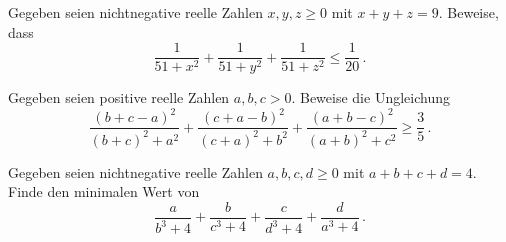 \begin{aufgabe*}\label{aufgabe:51}
	Gegeben seien nichtnegative reelle Zahlen $x,y,z\geqslant 0$ mit $x+y+z=9$. Beweise, dass
	\begin{equation*}
		\frac{1}{51+x^2}+\frac{1}{51+y^2}+\frac{1}{51+z^2}\leqslant \frac1{20}\,.
	\end{equation*}
\end{aufgabe*}
\begin{aufgabe*}\label{aufgabe:b+c-aUngleichung}
	Gegeben seien positive reelle Zahlen $a,b,c>0$. Beweise die Ungleichung
	\begin{equation*}
		\frac{(b+c-a)^2}{(b+c)^2+a^2}+\frac{(c+a-b)^2}{(c+a)^2+b^2}+\frac{(a+b-c)^2}{(a+b)^2+c^2}\geqslant \frac35\,.
	\end{equation*}
\end{aufgabe*}
\begin{aufgabe*}[*]\label{aufgabe:USAMO2017}
	Gegeben seien nichtnegative reelle Zahlen $a,b,c,d\geqslant 0$ mit $a+b+c+d=4$. Finde den minimalen Wert von
	\begin{equation*}
		\frac{a}{b^3+4}+\frac{b}{c^3+4}+\frac{c}{d^3+4}+\frac{d}{a^3+4}\,.
	\end{equation*}
\end{aufgabe*}

